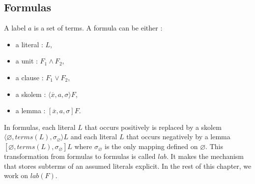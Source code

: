 \documentclass[a4paper,10pt]{report}
\newcommand{\terms}{\mathit{terms}}
\newcommand{\T}{\mathit{lab}}
\begin{document}
\subsection{Formulas}
\noindent
A label $a$ is a set of terms. A formula can be either :
\begin{itemize}
 \item a literal : $L$,
 \item a unit : $F_1\wedge F_2$,
 \item a clause : $F_1\vee F_2$,
 \item a skolem : $\langle\overline x,a,\sigma\rangle F$,
 \item a lemma : $[\overline x,a,\sigma]F$.
\end{itemize}
In formulas, each literal $L$ that occurs positively is replaced by a skolem
$\langle\varnothing,\terms(L),\sigma_\varnothing\rangle L$ and each literal $L$ that occurs
negatively by a lemma $[\varnothing,\terms(L),\sigma_\varnothing]L$ where $\sigma_\varnothing$ is the
only mapping defined on $\varnothing$. This transformation from formulas to formulas is called
$\T$. It makes the mechanism that stores subterms of an assumed literals explicit. In the rest of
this chapter, we work on $\T(F)$.
\end{document}
